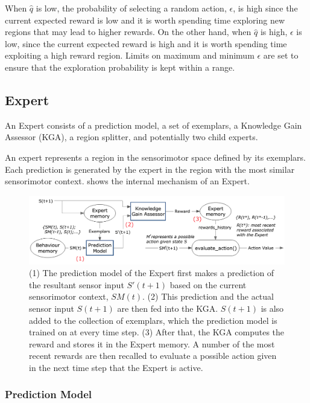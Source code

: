When $\widehat{q}$  is low, the probability of selecting a random action, $\epsilon$, is high since the current expected reward is low and it is worth spending time exploring new regions that may lead to higher rewards. On the other hand, when $\widehat{q}$ is high, $\epsilon$ is low, since the current expected reward is high and it is worth spending time exploiting a high reward region. Limits on maximum and minimum $\epsilon$ are set to ensure that the exploration probability is kept within a range.

\subsection{Expert}

An Expert consists of a prediction model, a set of exemplars, a Knowledge Gain Assessor (KGA), a region splitter, and potentially two child experts. 

An expert represents a region in the sensorimotor space defined by its exemplars. Each prediction is generated by the expert in the region with the most similar sensorimotor context.  shows the internal mechanism of an Expert.

\begin{figure}[!htb]
	\centering
	\includegraphics[width=1.0 \textwidth]{"fig/cbla/Block Diagram Expert"}
	\caption[Block diagram of the Expert]{(1) The prediction model of the Expert first makes a prediction of the resultant sensor input $S'(t+1)$ based on the current sensorimotor context, $SM(t)$. (2) This prediction and the actual sensor input $S(t+1)$ are then fed into the KGA. $S(t+1)$ is also added to the collection of exemplars, which the prediction model is trained on at every time step. (3) After that, the KGA computes the reward and stores it in the Expert memory. A number of the most recent rewards are then recalled to evaluate a possible action given in the next time step that the Expert is active.}
	\label{fig:Block Diagram Expert}
\end{figure}


\subsubsection{Prediction Model}

